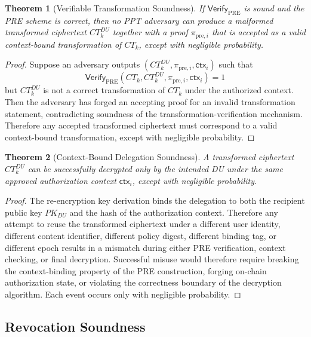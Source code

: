 \documentclass[conference]{IEEEtran}
\newtheorem{theorem}{Theorem}
\begin{document}
\begin{theorem}[Verifiable Transformation Soundness]
If $\textsf{Verify}_{\mathrm{PRE}}$ is sound and the PRE scheme is correct, then no PPT adversary can produce a malformed transformed ciphertext $CT_k^{DU}$ together with a proof $\pi_{\mathrm{pre},i}$ that is accepted as a valid context-bound transformation of $CT_k$, except with negligible probability.
\end{theorem}

\begin{proof}
Suppose an adversary outputs $(CT_k^{DU},\pi_{\mathrm{pre},i},\mathsf{ctx}_i)$ such that
\[
\textsf{Verify}_{\mathrm{PRE}}(CT_k,CT_k^{DU},\pi_{\mathrm{pre},i},\mathsf{ctx}_i)=1
\]
but $CT_k^{DU}$ is not a correct transformation of $CT_k$ under the authorized context. Then the adversary has forged an accepting proof for an invalid transformation statement, contradicting soundness of the transformation-verification mechanism. Therefore any accepted transformed ciphertext must correspond to a valid context-bound transformation, except with negligible probability.
\end{proof}

\begin{theorem}[Context-Bound Delegation Soundness]
A transformed ciphertext $CT_k^{DU}$ can be successfully decrypted only by the intended DU under the same approved authorization context $\mathsf{ctx}_i$, except with negligible probability.
\end{theorem}

\begin{proof}
The re-encryption key derivation binds the delegation to both the recipient public key $PK_{DU}$ and the hash of the authorization context. Therefore any attempt to reuse the transformed ciphertext under a different user identity, different content identifier, different policy digest, different binding tag, or different epoch results in a mismatch during either PRE verification, context checking, or final decryption. Successful misuse would therefore require breaking the context-binding property of the PRE construction, forging on-chain authorization state, or violating the correctness boundary of the decryption algorithm. Each event occurs only with negligible probability.
\end{proof}

\subsection{Revocation Soundness}
\end{document}
